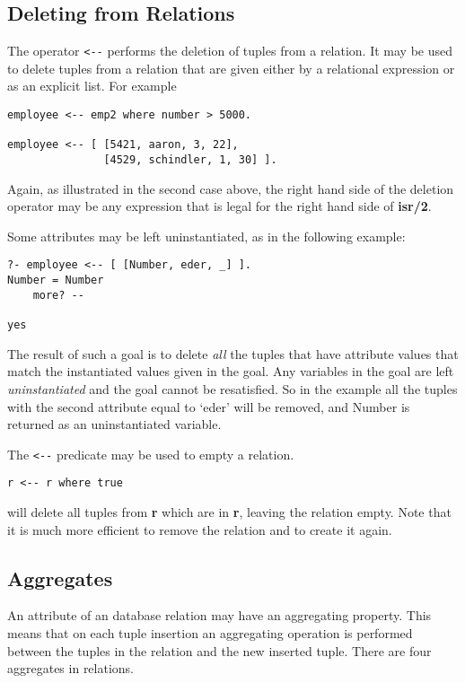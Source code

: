 \subsection{Deleting from Relations}
The operator \verb+<--+  performs the deletion of 
tuples from a relation. 
It may be used to delete tuples from a relation that are given 
either by a relational expression or as an
explicit list. For example
\begin{verbatim}
employee <-- emp2 where number > 5000.

employee <-- [ [5421, aaron, 3, 22],
               [4529, schindler, 1, 30] ].
\end{verbatim}
Again, as illustrated in the second case above, the right hand side
of the deletion operator may be any expression that is legal for 
the right hand side of  {\bf isr/2}.

Some attributes may be left uninstantiated, as in the following
example:

\begin{verbatim}
?- employee <-- [ [Number, eder, _] ].
Number = Number
	more? -- 

yes
\end{verbatim}

The result of such a goal is to delete {\em all} the tuples 
that have attribute values that match the instantiated values given
in the goal.  Any variables in the goal
are left {\em uninstantiated} and the goal cannot be resatisfied.
So in the example all the tuples with 
the second attribute equal to `eder' will be removed,
and Number is returned as an uninstantiated variable.

The \verb+<--+ predicate may  be used to empty a relation. 
\begin{verbatim}
r <-- r where true
\end{verbatim}
will delete all tuples from {\bf r} which are in {\bf r}, leaving the
relation empty. Note that it is much more efficient to remove the relation
and to create it again.

\subsection{Aggregates}
An attribute of an \eclipse database relation may have an aggregating
property. This means that on each tuple insertion an aggregating
operation is performed between the tuples in the relation and
the new inserted tuple. There are four aggregates in \eclipse relations.

